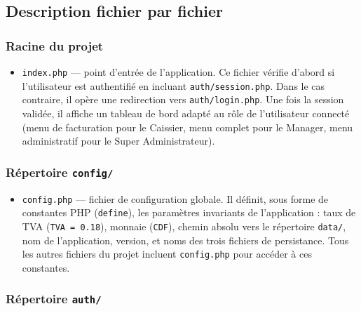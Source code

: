 \documentclass[12pt,a4paper]{article}
\begin{document}
\subsection{Description fichier par fichier}

\subsubsection{Racine du projet}

\begin{itemize}[leftmargin=1.5em]
    \item \texttt{index.php} --- point d'entrée de l'application. Ce fichier vérifie d'abord si l'utilisateur est authentifié en incluant \texttt{auth/session.php}. Dans le cas contraire, il opère une redirection vers \texttt{auth/login.php}. Une fois la session validée, il affiche un tableau de bord adapté au rôle de l'utilisateur connecté (menu de facturation pour le Caissier, menu complet pour le Manager, menu administratif pour le Super Administrateur).
\end{itemize}

\subsubsection{Répertoire \texttt{config/}}

\begin{itemize}[leftmargin=1.5em]
    \item \texttt{config.php} --- fichier de configuration globale. Il définit, sous forme de constantes PHP (\texttt{define}), les paramètres invariants de l'application : taux de TVA (\texttt{TVA = 0.18}), monnaie (\texttt{CDF}), chemin absolu vers le répertoire \texttt{data/}, nom de l'application, version, et noms des trois fichiers de persistance. Tous les autres fichiers du projet incluent \texttt{config.php} pour accéder à ces constantes.
\end{itemize}

\subsubsection{Répertoire \texttt{auth/}}
\end{document}
